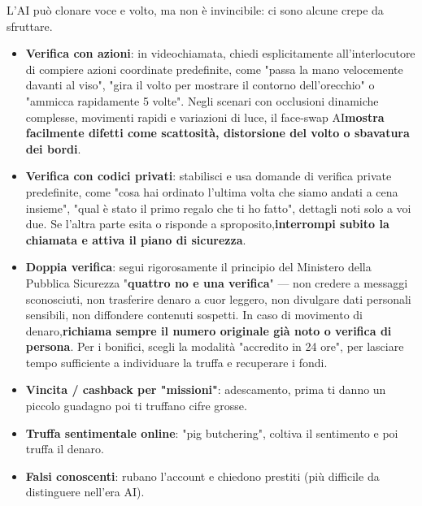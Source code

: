 
L'AI può clonare voce e volto, ma non è invincibile: ci sono alcune crepe da sfruttare.

\begin{itemize}
  \item \textbf{Verifica con azioni}: in videochiamata, chiedi esplicitamente all'interlocutore di compiere azioni coordinate predefinite, come "passa la mano velocemente davanti al viso", "gira il volto per mostrare il contorno dell'orecchio" o "ammicca rapidamente 5 volte". Negli scenari con occlusioni dinamiche complesse, movimenti rapidi e variazioni di luce, il face-swap AI\textbf{mostra facilmente difetti come scattosità, distorsione del volto o sbavatura dei bordi}.
  \item \textbf{Verifica con codici privati}: stabilisci e usa domande di verifica private predefinite, come "cosa hai ordinato l'ultima volta che siamo andati a cena insieme", "qual è stato il primo regalo che ti ho fatto", dettagli noti solo a voi due. Se l'altra parte esita o risponde a sproposito,\textbf{interrompi subito la chiamata e attiva il piano di sicurezza}.
  \item \textbf{Doppia verifica}: segui rigorosamente il principio del Ministero della Pubblica Sicurezza "\textbf{quattro no e una verifica}" — non credere a messaggi sconosciuti, non trasferire denaro a cuor leggero, non divulgare dati personali sensibili, non diffondere contenuti sospetti. In caso di movimento di denaro,\textbf{richiama sempre il numero originale già noto o verifica di persona}. Per i bonifici, scegli la modalità "accredito in 24 ore", per lasciare tempo sufficiente a individuare la truffa e recuperare i fondi.
\end{itemize}


\begin{itemize}
  \item \textbf{Vincita / cashback per "missioni"}: adescamento, prima ti danno un piccolo guadagno poi ti truffano cifre grosse.
  \item \textbf{Truffa sentimentale online}: "pig butchering", coltiva il sentimento e poi truffa il denaro.
  \item \textbf{Falsi conoscenti}: rubano l'account e chiedono prestiti (più difficile da distinguere nell'era AI).
\end{itemize}

